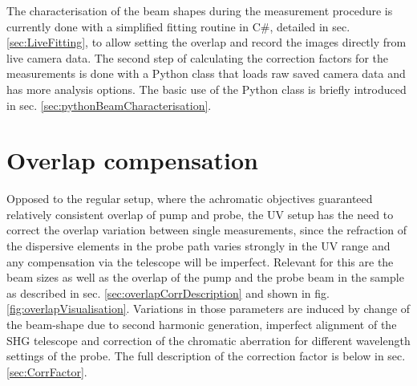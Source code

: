 \documentclass[twoside,openright,listof=numbered]{scrreprt}
\begin{document}
The characterisation of the beam shapes during the measurement procedure is currently done with a simplified fitting routine in C\#, detailed in sec. \ref{sec:LiveFitting}, to allow setting the overlap and record the images directly from live camera data. The second step of calculating the correction factors for the measurements is done with a Python class that loads raw saved camera data and has more analysis options. The basic use of the Python class is briefly introduced in sec. \ref{sec:pythonBeamCharacterisation}.
\section{Overlap compensation}\label{sec:overlapComp}
Opposed to the regular setup, where the achromatic objectives guaranteed relatively consistent overlap of pump and probe, the UV setup has the need to correct the overlap variation between single measurements, since the refraction of the dispersive elements in the probe path varies strongly in the UV range and any compensation via the telescope will be imperfect.\newline
Relevant for this are the beam sizes as well as the overlap of the pump and the probe beam in the sample as described in sec. \ref{sec:overlapCorrDescription} and shown in fig. \ref{fig:overlapVisualisation}. Variations in those parameters are induced by change of the beam-shape due to second harmonic generation, imperfect alignment of the SHG telescope and correction of the chromatic aberration for different wavelength settings of the probe. The full description of the correction factor is below in sec. \ref{sec:CorrFactor}.\\
\end{document}
